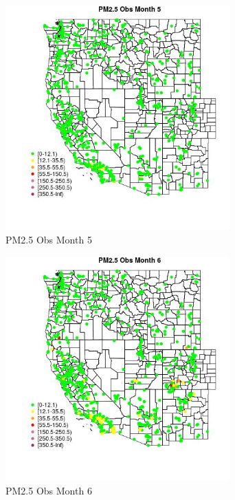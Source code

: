 \begin{figure} 
\centering  
\includegraphics[width=0.77\textwidth]{Code_Outputs/Report_ML_input_PM25_Step4_part_f_de_duplicated_aveswNAs_MapObsMo5PM25_Obs.jpg} 
\caption{\label{fig:Report_ML_input_PM25_Step4_part_f_de_duplicated_aveswNAsMapObsMo5PM25_Obs}PM2.5 Obs Month 5} 
\end{figure} 
 

\begin{figure} 
\centering  
\includegraphics[width=0.77\textwidth]{Code_Outputs/Report_ML_input_PM25_Step4_part_f_de_duplicated_aveswNAs_MapObsMo6PM25_Obs.jpg} 
\caption{\label{fig:Report_ML_input_PM25_Step4_part_f_de_duplicated_aveswNAsMapObsMo6PM25_Obs}PM2.5 Obs Month 6} 
\end{figure} 
 

